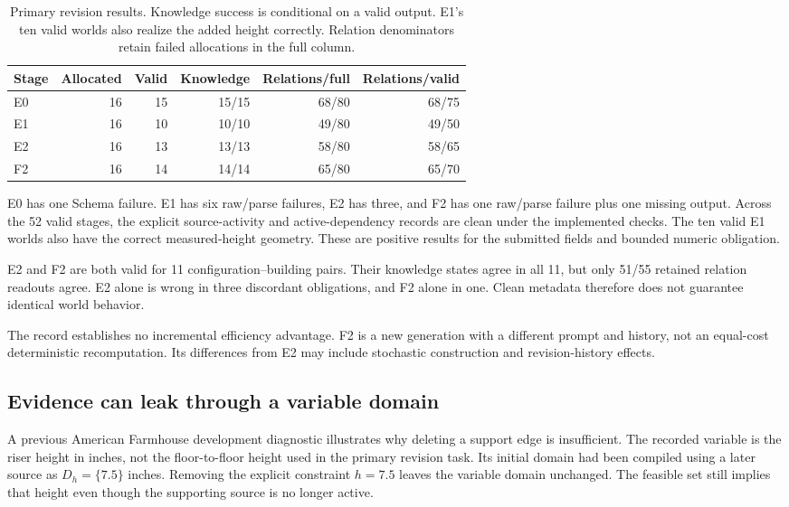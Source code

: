 \begin{table}[htbp]\centering\small
\begin{tabular}{lrrrrr}\toprule
Stage & Allocated & Valid & Knowledge & Relations/full & Relations/valid\\\midrule
E0 & 16 & 15 & 15/15 & 68/80 & 68/75\\
E1 & 16 & 10 & 10/10 & 49/80 & 49/50\\
E2 & 16 & 13 & 13/13 & 58/80 & 58/65\\
F2 & 16 & 14 & 14/14 & 65/80 & 65/70\\\bottomrule
\end{tabular}
\caption{Primary revision results. Knowledge success is conditional on a valid output. E1's ten valid worlds also realize the added height correctly. Relation denominators retain failed allocations in the full column.}\label{tab:H-stages}
\end{table}

E0 has one Schema failure. E1 has six raw/parse failures, E2 has three, and F2 has one raw/parse failure plus one missing output. Across the 52 valid stages, the explicit source-activity and active-dependency records are clean under the implemented checks. The ten valid E1 worlds also have the correct measured-height geometry. These are positive results for the submitted fields and bounded numeric obligation.

E2 and F2 are both valid for 11 configuration--building pairs. Their knowledge states agree in all 11, but only 51/55 retained relation readouts agree. E2 alone is wrong in three discordant obligations, and F2 alone in one. Clean metadata therefore does not guarantee identical world behavior.

The record establishes no incremental efficiency advantage. F2 is a new generation with a different prompt and history, not an equal-cost deterministic recomputation. Its differences from E2 may include stochastic construction and revision-history effects.

\subsection{Evidence can leak through a variable domain}
A previous American Farmhouse development diagnostic illustrates why deleting a support edge is insufficient. The recorded variable is the riser height in inches, not the floor-to-floor height used in the primary revision task. Its initial domain had been compiled using a later source as $D_h=\{7.5\}$ inches. Removing the explicit constraint $h=7.5$ leaves the variable domain unchanged. The feasible set still implies that height even though the supporting source is no longer active.

